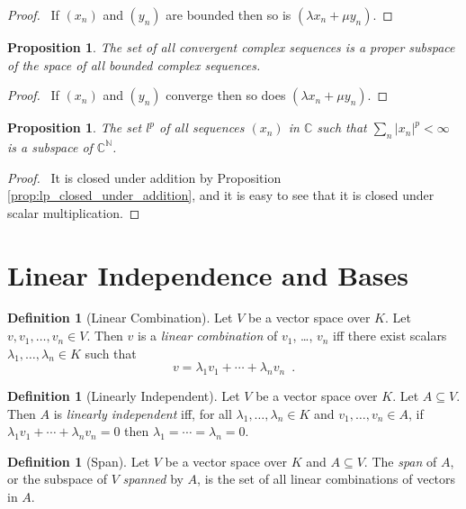 \documentclass{book}
\let\qed\relax
\newtheorem{prop}[ax]{Proposition}
\theoremstyle{definition}
\newtheorem{df}[ax]{Definition}
\begin{document}
\begin{proof}
\pf\ If $(x_n)$ and $(y_n)$ are bounded then so is $(\lambda x_n + \mu y_n)$. \qed
\end{proof}

\begin{prop}
The set of all convergent complex sequences is a proper subspace of the space of all bounded complex sequences.
\end{prop}

\begin{proof}
\pf\ If $(x_n)$ and $(y_n)$ converge then so does $(\lambda x_n + \mu y_n)$. \qed
\end{proof}

\begin{prop}
The set $l^p$ of all sequences $(x_n)$ in $\mathbb{C}$ such that $\sum_n |x_n|^p < \infty$ is a subspace of $\mathbb{C}^\mathbb{N}$.
\end{prop}

\begin{proof}
\pf\ It is closed under addition by Proposition \ref{prop:lp_closed_under_addition}, and it is easy to see that it is closed under scalar multiplication. \qed
\end{proof}

\section{Linear Independence and Bases}

\begin{df}[Linear Combination]
Let $V$ be a vector space over $K$. Let $v, v_1, \ldots, v_n \in V$. Then $v$ is a \emph{linear combination} of $v_1$, \ldots, $v_n$ iff there exist scalars $\lambda_1, \ldots, \lambda_n \in K$ such that
\[ v = \lambda_1 v_1 + \cdots + \lambda_n v_n \enspace . \]
\end{df}

\begin{df}[Linearly Independent]
Let $V$ be a vector space over $K$. Let $A \subseteq V$. Then $A$ is \emph{linearly independent} iff, for all $\lambda_1, \ldots, \lambda_n \in K$ and $v_1, \ldots, v_n \in A$, if $\lambda_1 v_1 + \cdots + \lambda_n v_n = 0$ then $\lambda_1 = \cdots = \lambda_n = 0$.
\end{df}

\begin{df}[Span]
Let $V$ be a vector space over $K$ and $A \subseteq V$. The \emph{span} of $A$, or the subspace of $V$ \emph{spanned} by $A$, is the set of all linear combinations of vectors in $A$.
\end{df}
\end{document}
